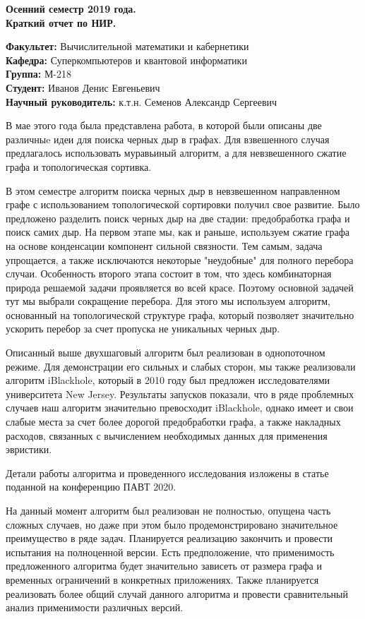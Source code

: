\documentclass[12pt,a4paper]{scrartcl}
\begin{document}
\Large

\begin{center}
\textbf{Осенний семестр 2019 года. \\
Краткий отчет по НИР.}
\end{center}

\hfill\begin{minipage}{0.6\textwidth}
    \normalsize
    \textbf{Факультет:} Вычислительной математики и кабернетики \\
    \textbf{Кафедра:} Суперкомпьютеров и квантовой информатики \\
    \textbf{Группа:} М-218 \\
    \textbf{Студент:} Иванов Денис Евгеньевич \\
    \textbf{Научный руководитель:} к.т.н. Семенов Александр Сергеевич \\
\end{minipage}
\vfill

\normalsize
В мае этого года была представлена работа, в которой были описаны две различныe идеи для
поиска черных дыр в графах. Для взвешенного случая предлагалось использовать муравьиный алгоритм,
а для невзвешенного сжатие графа и топологическая сортивка.

В этом семестре алгоритм поиска черных дыр в невзвешенном направленном графе с использованием топологической сортировки получил
свое развитие. Было предложено разделить поиск черных дыр на две стадии: предобработка графа и поиск самих дыр.
На первом этапе мы, как и раньше, используем сжатие графа на основе конденсации компонент сильной связности.
Тем самым, задача упрощается, а также исключаются некоторые "неудобные" для полного перебора случаи.
Особенность второго этапа состоит в том, что здесь комбинаторная природа решаемой задачи проявляется во 
всей красе. Поэтому основной задачей тут мы выбрали сокращение перебора.
Для этого мы используем алгоритм, основанный на топологической структуре графа, который позволяет
значительно ускорить перебор за счет пропуска не уникальных черных дыр.

Описанный выше двухшаговый алгоритм был реализован в однопоточном режиме.
Для демонстрации его сильных и слабых сторон, мы также реализовали алгоритм iBlackhole, который в 2010 году был
предложен исследователями университета New Jersey. Результаты запусков показали, что в ряде проблемных 
случаев наш алгоритм значительно превосходит iBlackhole, однако имеет и свои слабые места за счет более дорогой предобработки графа,
а также накладных расходов, связанных с вычислением необходимых данных для применения эвристики.

Детали работы алгоритма и проведенного исследования изложены в статье поданной на конференцию ПАВТ 2020.

На данный момент алгоритм был реализован не полностью, опущена часть сложных случаев, но даже при этом было
продемонстрировано значительное преимущество в ряде задач. Планируется реализацию закончить и провести испытания
на полноценной версии. Есть предположение, что применимость предложенного алгоритма будет значительно зависеть от размера графа и временных ограничений
в конкретных приложениях. Также планируется реализовать более общий случай данного алгоритма и провести сравнительный анализ применимости
различных версий.
\end{document}

